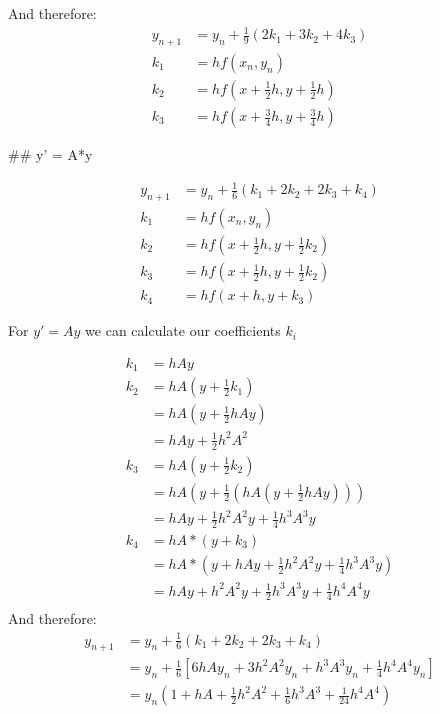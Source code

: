 And therefore:
\begin{align}
y_{n+1} &= y_n + \frac{1}{9}(2 k_1 + 3 k_2 + 4 k_3)\\
k_1 &= hf(x_n,y_n)\\
k_2 &= hf(x+\frac{1}{2}h, y+\frac{1}{2}h)\\
k_3 &= hf(x+\frac{3}{4}h, y+\frac{3}{4}h)
\end{align}

## y' = A*y

\begin{align}
y_{n+1} &= y_n + \frac{1}{6}(k_1 + 2 k_2 + 2 k_3+ k_4)\\
k_1 &= hf(x_n,y_n)\\
k_2 &= hf(x+\frac{1}{2}h, y +\frac{1}{2}k_2)\\
k_3 &= hf(x+\frac{1}{2}h, y +\frac{1}{2}k_2)\\
k_4 &= hf(x+h, y + k_3)
\end{align}

For $y' = Ay$ we can calculate our coefficients $k_i$

\begin{align}
k_1 &= hAy\\
k_2 &= hA(y + \frac{1}{2}k_1)\\
&= hA(y + \frac{1}{2}hAy)\\
&= hAy + \frac{1}{2}h^2A^2\\
k_3 &= hA(y + \frac{1}{2}k_2)\\
&= hA(y + \frac{1}{2}(hA(y + \frac{1}{2}hAy)))\\
&= hAy + \frac{1}{2}h^2A^2 y + \frac{1}{4}h^3A^3y\\
k_4 &= hA*(y+k_3)\\
&= hA *(y + hAy + \frac{1}{2}h^2A^2 y + \frac{1}{4}h^3A^3y)\\
&= hAy + h^2A^2y + \frac{1}{2}h^3A^3 y + \frac{1}{4}h^4A^4y\\
\end{align}
And therefore:
\begin{align}
y_{n+1} &= y_n + \frac{1}{6}(k_1 + 2 k_2 + 2 k_3+ k_4)\\
&= y_n + \frac{1}{6} \left[ 6hAy_n + 3 h^2 A^2 y_n + h^3A^3y_n + \frac{1}{4} h^4A^4y_n\right]\\
&= y_n  \left(1+ hA + \frac{1}{2} h^2 A^2 + \frac{1}{6} h^3A^3 + \frac{1}{24} h^4A^4\right)
\end{align}